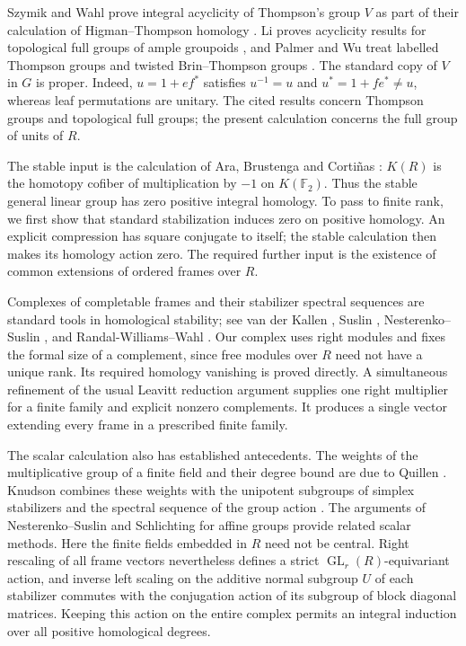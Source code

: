 \documentclass[11pt]{amsart}
\newcommand{\F}{\mathbb F}
\DeclareMathOperator{\GL}{GL}
\theoremstyle{definition}
\theoremstyle{remark}
\numberwithin{equation}{section}
\begin{document}
Szymik and Wahl prove integral acyclicity of Thompson's group $V$ as part of their calculation of Higman--Thompson homology \cite{SW19}. Li proves acyclicity results for topological full groups of ample groupoids \cite[Corollary~D]{Li25}, and Palmer and Wu treat labelled Thompson groups and twisted Brin--Thompson groups \cite[Theorems~A and~C]{PW25}. The standard copy of $V$ in $G$ is proper. Indeed, $u=1+ef^*$ satisfies $u^{-1}=u$ and $u^*=1+fe^*\ne u$, whereas leaf permutations are unitary. The cited results concern Thompson groups and topological full groups; the present calculation concerns the full group of units of $R$.

The stable input is the calculation of Ara, Brustenga and Corti\~nas \cite[Theorem~7.6]{ABC09}: $K(R)$ is the homotopy cofiber of multiplication by $-1$ on $K(\F_2)$. Thus the stable general linear group has zero positive integral homology. To pass to finite rank, we first show that standard stabilization induces zero on positive homology. An explicit compression has square conjugate to itself; the stable calculation then makes its homology action zero. The required further input is the existence of common extensions of ordered frames over $R$.

Complexes of completable frames and their stabilizer spectral sequences are standard tools in homological stability; see van der Kallen \cite{vdK80}, Suslin \cite{Suslin84}, Nesterenko--Suslin \cite[\S2]{NS90}, and Randal-Williams--Wahl \cite{RWW17}. Our complex uses right modules and fixes the formal size of a complement, since free modules over $R$ need not have a unique rank. Its required homology vanishing is proved directly. A simultaneous refinement of the usual Leavitt reduction argument \cite[Theorem~2.2.11]{AAS17} supplies one right multiplier for a finite family and explicit nonzero complements. It produces a single vector extending every frame in a prescribed finite family.

The scalar calculation also has established antecedents. The weights of the multiplicative group of a finite field and their degree bound are due to Quillen \cite[\S11, Lemmas~15--16]{Quillen72}. Knudson combines these weights with the unipotent subgroups of simplex stabilizers and the spectral sequence of the group action \cite[Proposition~2.1 and Theorem~3.1]{Knudson02}. The arguments of Nesterenko--Suslin \cite[Proposition~1.10 and Theorem~1.11]{NS90} and Schlichting \cite[\S2]{Schlichting17} for affine groups provide related scalar methods. Here the finite fields embedded in $R$ need not be central. Right rescaling of all frame vectors nevertheless defines a strict $\GL_r(R)$-equivariant action, and inverse left scaling on the additive normal subgroup $U$ of each stabilizer commutes with the conjugation action of its subgroup of block diagonal matrices. Keeping this action on the entire complex permits an integral induction over all positive homological degrees.
\end{document}
